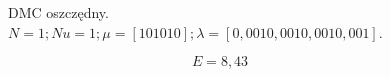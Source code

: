 

\begin{figure}[H]
    \centering
    
    \caption{DMC oszczędny.$ N = 1; Nu = 1; \mu = [10 10 10]; \lambda = [0,001 0,001 0,001 0,001].$}
\end{figure}

\begin{equation}
    E = 8,43
\end{equation}

%     



%     


%     


%     

